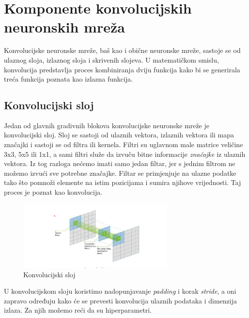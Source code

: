
\chapter{Komponente konvolucijskih neuronskih mreža}\label{ch:komponente-konvolucijskih-neuronskih-mreza}
Konvolucijske neuronske mreže, baš kao i obične neuronske mreže, sastoje se od ulaznog sloja, izlaznog sloja i skrivenih slojeva.
U matematičkom smislu, konvolucija predstavlja proces kombiniranja dviju funkcija kako bi se generirala treća funkcija poznata kao izlazna funkcija.

\section{Konvolucijski sloj}\label{sec:konvolucijski-sloj}
Jedan od glavnih gradivnih blokova konvolucijske neuronske mreže je konvolucijski sloj.
Sloj se sastoji od ulaznih vektora, izlaznih vektora ili mapa značajki i sastoji se od filtra ili kernela.
Filtri su uglavnom male matrice veličine 3x3, 5x5 ili 1x1, a sami filtri služe da izvuču bitne informacije \emph{značajke} iz ulaznih vektora.
Iz tog razloga nećemo imati samo jedan filtar, jer s jednim filtrom ne možemo izvući sve potrebne značajke.
Filtar se primjenjuje na ulazne podatke tako što pomnoži elemente na istim pozicijama i sumira njihove vrijednosti.
Taj proces je poznat kao konvolucija.

\FloatBarrier
\begin{figure}[h]
    \centering
    \includegraphics[width=0.7\textwidth]{images/Convolution}
    \caption{Konvolucijski sloj
    \protect\footnotemark}
    \label{fig:slika13}
\end{figure}
\FloatBarrier


U konvolucijskom sloju koristimo nadopunjavanje \emph{padding} i korak \emph{stride}, a oni zapravo određuju kako će se prevesti konvolucija ulaznih podataka i dimenzija izlaza.
Za njih možemo reći da su hiperparametri.

